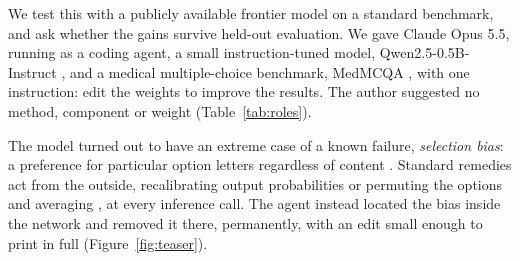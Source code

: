 \documentclass[11pt]{article}
\begin{document}
We test this with a publicly available frontier model on a standard benchmark, and ask whether the gains survive held-out evaluation. We gave Claude Opus 5.5, running as a coding agent, a small instruction-tuned model, Qwen2.5-0.5B-Instruct \citep{qwen2024qwen25}, and a medical multiple-choice benchmark, MedMCQA \citep{pal2022medmcqa}, with one instruction: edit the weights to improve the results. The author suggested no method, component or weight (Table~\ref{tab:roles}).

The model turned out to have an extreme case of a known failure, \emph{selection bias}: a preference for particular option letters regardless of content \citep{zheng2024selectors,pezeshkpour2024order}. Standard remedies act from the outside, recalibrating output probabilities \citep{zhao2021calibrate} or permuting the options and averaging \citep{zheng2024selectors}, at every inference call. The agent instead located the bias inside the network and removed it there, permanently, with an edit small enough to print in full (Figure~\ref{fig:teaser}).
\end{document}
